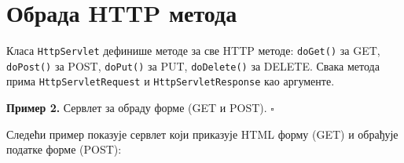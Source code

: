 \section{Обрада HTTP метода}

Класа \texttt{HttpServlet} дефинише методе за све HTTP методе: \texttt{doGet()} за GET, \texttt{doPost()} за POST, \texttt{doPut()} за PUT, \texttt{doDelete()} за DELETE. Свака метода прима \texttt{HttpServletRequest} и \texttt{HttpServletResponse} као аргументе.


\bigskip

\noindent \textbf{Пример 2.} Сервлет за обраду форме (GET и POST). $\square$

\medskip

Следећи пример показује сервлет који приказује HTML форму (GET) и обрађује податке форме (POST):



